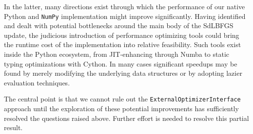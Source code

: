 \documentclass{article}
\begin{document}
In the latter, many directions exist through which the performance of our native
Python and \texttt{NumPy} implementation might improve significantly. Having
identified and dealt with potential bottlenecks around the main body of the
SdLBFGS update, the judicious introduction of performance optimizing tools could
bring the runtime cost of the implementation into relative feasibility. Such
tools exist inside the Python ecosystem, from JIT-enhancing through Numba to
static typing optimizations with Cython. In many cases significant speedups may
be found by merely modifying the underlying data structures or by adopting
lazier evaluation techniques.

The central point is that we cannot rule out the
\texttt{ExternalOptimizerInterface} approach until the exploration of these
potential improvements has sufficiently resolved the questions raised above.
Further effort is needed to resolve this partial result.




\printbibliography[heading=bibintoc]
\end{document}

